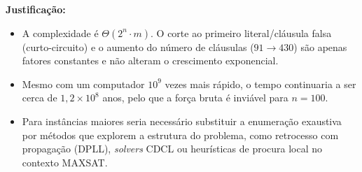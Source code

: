 \documentclass[11pt,a4paper]{article}
\begin{document}
\textbf{Justificação:}

\begin{itemize}[leftmargin=1.4em,itemsep=2pt]
  \item A complexidade é $\Theta(2^n \cdot m)$. O corte ao primeiro literal/cláusula
        falsa (curto-circuito) e o aumento do número de cláusulas
        ($91 \rightarrow 430$) são apenas fatores constantes e não alteram o
        crescimento exponencial.
  \item Mesmo com um computador $10^9$ vezes mais rápido, o tempo continuaria a ser
        cerca de $1{,}2 \times 10^{8}$ anos, pelo que a força bruta é inviável para
        $n = 100$.
  \item Para instâncias maiores seria necessário substituir a enumeração exaustiva por
        métodos que explorem a estrutura do problema, como retrocesso com propagação
        (DPLL), \textit{solvers} CDCL ou heurísticas de procura local no contexto MAXSAT.
\end{itemize}
\end{document}
